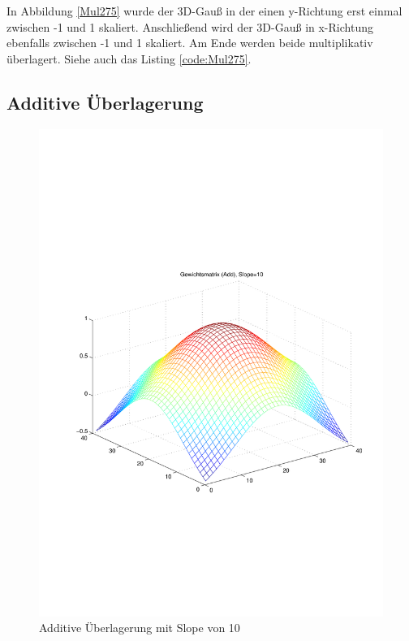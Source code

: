 In Abbildung \ref{Mul275} wurde der 3D-Gauß in der einen y-Richtung erst einmal zwischen -1 und 1 skaliert. Anschließend wird der 3D-Gauß in x-Richtung ebenfalls zwischen -1 und 1 skaliert. Am Ende werden beide multiplikativ überlagert. Siehe auch das Listing \ref{code:Mul275}.

\newpage
\subsection{Additive Überlagerung}
\begin{figure}[hbt]
	\begin{minipage}{0.5 \textwidth}
		\includegraphics[width=\textwidth]{./Bilder/Auswertung/Gewichtsmatrix/Gewichtsmatrix_Add_Slope_10}
		\caption{Additive Überlagerung mit Slope von 10}
		\label{Add10}
	\end{minipage}
	\hfill
	\begin{minipage}{0.5 \textwidth}

\end{minipage}
\end{figure}
